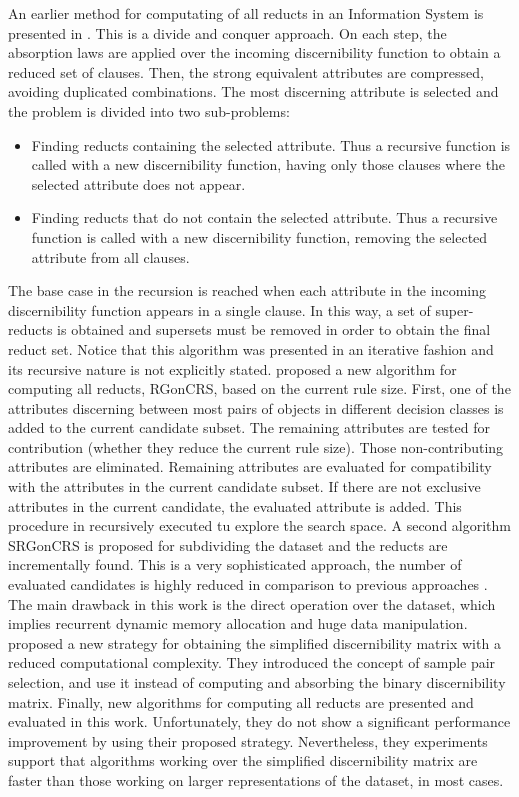 \documentclass[authoryear,preprint,review,12pt]{elsarticle}
\begin{document}
  An earlier method for computating of all reducts in an Information System is presented in
  \citep{Starzyk99,Starzyk00}.
  This is a divide and conquer approach. On each step, the absorption laws are applied over the incoming
  discernibility function to obtain a reduced set of clauses. Then, the strong equivalent attributes are 
  compressed, avoiding duplicated combinations. The most discerning attribute is selected and the problem 
  is divided into two sub-problems: 
  \begin{itemize}
  \item Finding reducts containing the selected attribute. Thus a recursive function is called with a new 
  discernibility function, having only those clauses where the selected attribute does not appear.
  \item Finding reducts that do not contain the selected attribute. Thus a recursive function is called with 
  a new discernibility function, removing the selected attribute from all clauses.
  \end{itemize}
  The base case in the recursion is reached when each attribute in the incoming discernibility function appears 
  in a single clause. In this way, a set of super-reducts is obtained and supersets must be removed in order 
  to obtain the final reduct set. Notice that this algorithm was presented in an iterative fashion and its 
  recursive nature is not explicitly stated.  
  \cite{WangP07} proposed a new algorithm for computing all reducts, RGonCRS, based on the current rule size. 
  First, one of the attributes discerning between most pairs of objects in different decision classes is added 
  to the current candidate subset. 
  The remaining attributes are tested for contribution (whether they reduce the current rule
  size). Those non-contributing attributes are eliminated. Remaining attributes are evaluated for compatibility 
  with the attributes in the current candidate subset. If there are not exclusive attributes in the current
  candidate, the evaluated attribute is added. This procedure in recursively executed tu explore the search
  space. A second algorithm SRGonCRS is proposed for subdividing the dataset and the reducts are incrementally
  found. This is a very sophisticated approach, the number of evaluated candidates is highly reduced in comparison
  to previous approaches \citep{Bazan2001,Ohrn00}. The main drawback in this work is the direct operation over
  the dataset, which implies recurrent dynamic memory allocation and huge data manipulation.
  \cite{Chen2012} proposed a new strategy for obtaining the simplified discernibility matrix with a reduced
  computational complexity. They introduced the concept of sample pair selection, and use it instead of computing 
  and absorbing the binary discernibility matrix. Finally, new algorithms for computing all reducts are presented
  and evaluated in this work. Unfortunately, they do not show a significant performance improvement by using their
  proposed strategy. Nevertheless, they experiments support that algorithms working over the simplified 
  discernibility matrix are faster than those working on larger representations of the dataset, in most cases.
  
\end{document}
